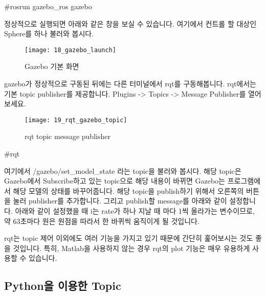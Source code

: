 \documentclass[11pt,fleqn]{book} %
\begin{document}
\#rosrun gazebo\_ros gazebo

정상적으로 실행되면 아래와 같은 창을 보실 수 있습니다. 여기에서 컨트롤 할 대상인 Sphere를 하나 불러와 봅시다.

\begin{figure}[h]
\centering\texttt{[image: 18\_gazebo\_launch]}
\caption{Gazebo 기본 화면}
\end{figure}

gazebo가 정상적으로 구동된 뒤에는 다른 터미널에서 rqt를 구동해봅니다.
rqt에서는 기본 topic publisher를 제공합니다. Plugins -> Topics -> Message Publisher를 열어보세요.

\begin{figure}[h]
\centering\texttt{[image: 19\_rqt\_gazebo\_topic]}
\caption{rqt topic message publisher}
\end{figure}

\#rqt

여기에서 /gazebo/set\_model\_state 라는 topic을 불러와 봅시다. 해당 topic은 Gazebo에서 Subscribe하고 있는 topic으로 해당 내용이 바뀌면
Gazebo는 프로그램에서 해당 모델의 상태를 바꾸어줍니다. 해당 topic을 publish하기 위해서 오른쪽의 \+ 버튼을 눌러 publisher를 추가합니다.
그리고 publish할 message를 아래와 같이 설정합니다. 아래와 같이 설정했을 때 i는 rate가 하나 지날 때 마다 1씩 올라가는 변수이므로, 약 63초마다 원은 원점을 따라서 한 바퀴씩 움직이게 될 것입니다.

rqt는 topic 제어 이외에도 여러 기능을 가지고 있기 때문에 간단히 훑어보시는 것도 좋을 것입니다.
특히, Matlab을 사용하지 않는 경우 rqt의 plot 기능은 매우 유용하게 사용할 수 있습니다.

\subsection{Python을 이용한 Topic }


%
%
%
%
\end{document}
